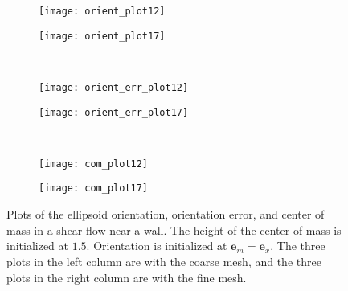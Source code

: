 \documentclass{article}
\newcommand{\vect}[1]{\boldsymbol{\mathbf{#1}}}
\begin{document}
\begin{figure}
  \centering
  \begin{subfigure}{0.49\textwidth}
    \texttt{[image: orient\_plot12]}
  \end{subfigure}
  \hfill
  \begin{subfigure}{0.49\textwidth}
    \texttt{[image: orient\_plot17]}
  \end{subfigure}
  \\
  \begin{subfigure}{0.49\textwidth}
    \texttt{[image: orient\_err\_plot12]}
  \end{subfigure}
  \hfill
  \begin{subfigure}{0.49\textwidth}
    \texttt{[image: orient\_err\_plot17]}
  \end{subfigure}
  \\
  \begin{subfigure}{0.49\textwidth}
    \texttt{[image: com\_plot12]}
  \end{subfigure}
  \hfill
  \begin{subfigure}{0.49\textwidth}
    \texttt{[image: com\_plot17]}
  \end{subfigure}
  \caption{Plots of the ellipsoid orientation, orientation error, and
    center of mass in a shear flow near a wall. The height of the
    center of mass is initialized at $1.5$. Orientation is initialized
    at $\vect{e}_m = \vect{e}_x$. The three plots in the left column
    are with the coarse mesh, and the three plots in the right column
    are with the fine mesh.}
  \label{fig:first-wall-test}
\end{figure}
\end{document}

